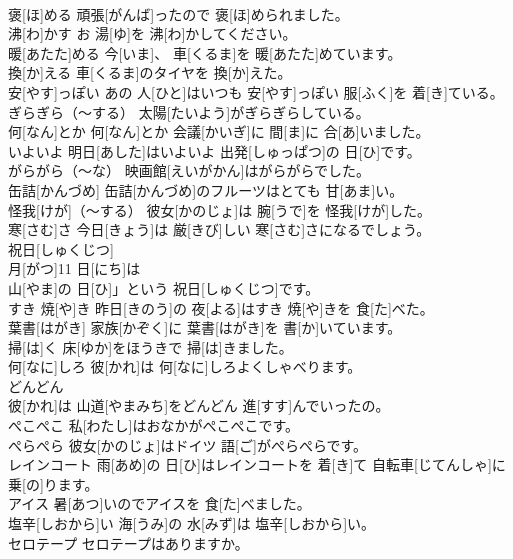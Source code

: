 \documentclass[8pt]{extreport}
\begin{document}
\begin{CJK}{UTF8}{min}
\\	褒[ほ]める	頑張[がんば]ったので 褒[ほ]められました。		
\\	沸[わ]かす	お 湯[ゆ]を 沸[わ]かしてください。		
\\	暖[あたた]める	今[いま]、 車[くるま]を 暖[あたた]めています。		
\\	換[か]える	車[くるま]のタイヤを 換[か]えた。		
\\	安[やす]っぽい	あの 人[ひと]はいつも 安[やす]っぽい 服[ふく]を 着[き]ている。		
\\	ぎらぎら（～する）	太陽[たいよう]がぎらぎらしている。		
\\	何[なん]とか	何[なん]とか 会議[かいぎ]に 間[ま]に 合[あ]いました。		
\\	いよいよ	明日[あした]はいよいよ 出発[しゅっぱつ]の 日[ひ]です。		
\\	がらがら（～な）	映画館[えいがかん]はがらがらでした。		
\\	缶詰[かんづめ]	缶詰[かんづめ]のフルーツはとても 甘[あま]い。		
\\	怪我[けが]（～する）	彼女[かのじょ]は 腕[うで]を 怪我[けが]した。		
\\	寒[さむ]さ	今日[きょう]は 厳[きび]しい 寒[さむ]さになるでしょう。		
\\	祝日[しゅくじつ]	
\\	月[がつ]11 日[にち]は
\\	山[やま]の 日[ひ]」という 祝日[しゅくじつ]です。		
\\	すき 焼[や]き	昨日[きのう]の 夜[よる]はすき 焼[や]きを 食[た]べた。		
\\	葉書[はがき]	家族[かぞく]に 葉書[はがき]を 書[か]いています。		
\\	掃[は]く	床[ゆか]をほうきで 掃[は]きました。		
\\	何[なに]しろ	彼[かれ]は 何[なに]しろよくしゃべります。		
\\	どんどん 
\\	彼[かれ]は 山道[やまみち]をどんどん 進[すす]んでいったの。		
\\	ぺこぺこ	私[わたし]はおなかがぺこぺこです。		
\\	ぺらぺら	彼女[かのじょ]はドイツ 語[ご]がぺらぺらです。		
\\	レインコート	雨[あめ]の 日[ひ]はレインコートを 着[き]て 自転車[じてんしゃ]に 乗[の]ります。		
\\	アイス	暑[あつ]いのでアイスを 食[た]べました。		
\\	塩辛[しおから]い	海[うみ]の 水[みず]は 塩辛[しおから]い。		
\\	セロテープ	セロテープはありますか。		

\end{CJK}
\end{document}
